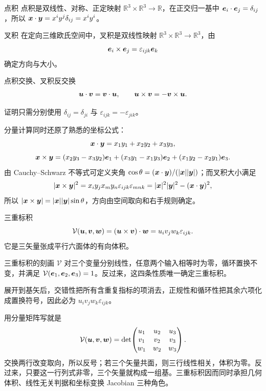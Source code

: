\begin{advdefinition}{点积}\label{advA3:def:dot}
点积是双线性、对称、正定映射 $\mathbb R^3\times\mathbb R^3\to\mathbb R$，在正交归一基中
$\bm{e}_i\cdot\bm{e}_j=\delta_{ij}$，所以
$\bm{x}\cdot\bm{y}=x^iy^j\delta_{ij}=x^iy^i$。
\end{advdefinition}

\begin{advdefinition}{叉积}\label{advA3:def:cross}
在定向三维欧氏空间中，叉积是双线性映射
$\mathbb R^3\times\mathbb R^3\to\mathbb R^3$，由
\[
 \bm{e}_i\times\bm{e}_j=\varepsilon_{ijk}\bm{e}_k
\]
确定方向与大小。
\end{advdefinition}

\begin{advtheorem}{点积交换、叉积反交换}\label{advA3:thm:dot-cross-symmetry}
\[
 \bm{u}\cdot\bm{v}=\bm{v}\cdot\bm{u},
 \qquad
 \bm{u}\times\bm{v}=-\bm{v}\times\bm{u}.
\]
\end{advtheorem}
证明只需分别使用 $\delta_{ij}=\delta_{ji}$ 与
$\varepsilon_{ijk}=-\varepsilon_{jik}$。

分量计算同时还原了熟悉的坐标公式：
\[
 \bm{x}\cdot\bm{y}=x_1y_1+x_2y_2+x_3y_3,
\]
\[
 \bm{x}\times\bm{y}=
 (x_2y_3-x_3y_2)\bm{e}_1
 +(x_3y_1-x_1y_3)\bm{e}_2
 +(x_1y_2-x_2y_1)\bm{e}_3.
\]
由 Cauchy--Schwarz 不等式可定义夹角
$\cos\theta=(\bm{x}\cdot\bm{y})/(|\bm{x}||\bm{y}|)$；而叉积大小满足
\[
 |\bm{x}\times\bm{y}|^2
 =x_iy_jx_my_n\varepsilon_{ijk}\varepsilon_{mnk}
 =|\bm{x}|^2|\bm{y}|^2-(\bm{x}\cdot\bm{y})^2,
\]
所以 $|\bm{x}\times\bm{y}|=|\bm{x}||\bm{y}|\sin\theta$，方向由空间取向和右手规则确定。

\begin{advdefinition}{三重标积}\label{advA3:def:triple-scalar}
\[
 \mathcal V(\bm{u},\bm{v},\bm{w})
 =(\bm{u}\times\bm{v})\cdot\bm{w}
 =u_iv_jw_k\varepsilon_{ijk}.
\]
它是三矢量张成平行六面体的有向体积。
\end{advdefinition}

\begin{advtheorem}{三重标积的刻画}\label{advA3:thm:triple-properties}
$\mathcal V$ 对三个变量分别线性，任意两个输入相等时为零，循环置换不变，并满足
$\mathcal V(\bm{e}_1,\bm{e}_2,\bm{e}_3)=1$。反过来，这四条性质唯一确定三重标积。
\end{advtheorem}
展开到基矢后，交错性把所有含重复指标的项消去，正规性和循环性把其余六项化成置换符号，因此必为
$u_iv_jw_k\varepsilon_{ijk}$。

用分量矩阵写就是
\[
 \mathcal V(\bm{u},\bm{v},\bm{w})=
 \det\!\begin{pmatrix}
 u_1&u_2&u_3\\v_1&v_2&v_3\\w_1&w_2&w_3
 \end{pmatrix}.
\]
交换两行改变取向，所以反号；若三个矢量共面，则三行线性相关，体积为零。反过来，只要这一行列式非零，三个矢量就构成一组基。三重标积因而同时承担几何体积、线性无关判据和坐标变换 Jacobian 三种角色。


